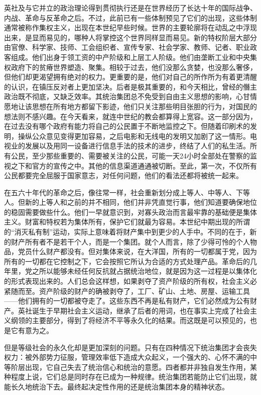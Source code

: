 英社及与它并立的政治理论得到贯彻执行还是在世界经历了长达十年的国际战争、内战、革命与反革命之后。不过，此前已有一些体制预见了它们的出现，这些体制通常被称作集权主义，出现在本世纪早些时候。世界的主要轮廓将在动乱之中浮现出来，是显而易见的，哪种人将掌控这个世界同样显而易见。新的特权阶层大部分由官僚、科学家、技师、工会组织者、宣传专家、社会学家、教师、记者、职业政客组成。他们出身于领工资的中产阶级和上层工人阶级。他们由垄断工业和中央集权政府下的贫瘠世界塑造、聚集。相较于过去，他们没那么贪婪，也没那么奢侈，但他们却更渴望拥有绝对的权力。更重要的是，他们对自己的所作所为有着更清醒的认识，在镇压反对者上更加坚决。后者是极其重要的，和今天相比，曾经的僭主政治既不彻底，又缺乏效率。其统治集团总不免受到自由主义思想的影响，心甘情愿地让该思想在所有地方都留下影迹，他们只关注那些明目张胆的行为，对国民的想法则不感兴趣。在今天看来，就连中世纪的教会都算得上宽容。这一部分因为，在过去没有哪个政府有能力将自己的公民置于不断地监控之下。但随着印刷术的发明，操纵公众意见变得更加容易，之后电影和无线电的发明又加剧了这一情形。电视业的发展以及用同一设备进行信息手法的技术的进步，终结了人们的私生活。所有公民，至少那些重要的、需要被关注的公民，可能一天24小时全部处在警察的监视之下和官方的宣传之中。其他的信息渠道通通被切断。至此，第一次，不仅所有公民都要完全屈服于国家意志，对任何问题，他们的看法还都将被统一起来。

在五六十年代的革命之后，像往常一样，社会重新划分成上等人、中等人、下等人。但新的上等人和之前的并不相同，他们并非凭直觉行事，他们知道要确保地位的稳固需要做些什么。他们一早就意识到，对寡头政治而言最牢靠的基础便是集体主义。财富和特权若为集体所有，保护它们就最为容易。本世纪中期出现的所谓的``消灭私有制''运动，实际上意味着将财产集中到更少的人手中。不同的在于，新的财产所有者不是若干个人，而是一个集团。就个人而言，除了少得可怜的个人物品，党员什么财产都没有。但对集体来说，在大洋国，所有的一切都属于党，因为所有的一切都在它控制之下，它会按照它所认为合适的方式处理产品。革命后的几年里，党之所以能够未经任何反抗就占据统治地位，就是因为这一过程是以集体化的形式表现出来的。人们总会这样想，如果剥夺了资产阶级的所有权，社会主义必紧随而至。资产阶级的财产的确被剥夺了，工厂、矿山、土地、房屋、运输工具——他们拥有的一切都被夺走了。这些东西不再是私有财产，它们必然成为公有财产。英社诞生于早期社会主义运动，继承了后者的用词，也在事实上完成了社会主义纲领的主要部分，得到了将经济不平等永久化的结果。而这既是可以预见的，也是它有意为之。

但是等级社会的永久化却是更加深刻的问题。只有在四种情况下统治集团才会丧失权力：被外部势力征服，管理效率低下造成大众起义，一个强大的、心怀不满的中等阶层出现，它自己失去了统治信心和统治的意愿。四者都并非独自发生作用，某种程度上说，它们总是同时存在已成为一种规律。统治集团若能防止它们出现，就能长久地统治下去。最终起决定性作用的还是统治集团本身的精神状态。

